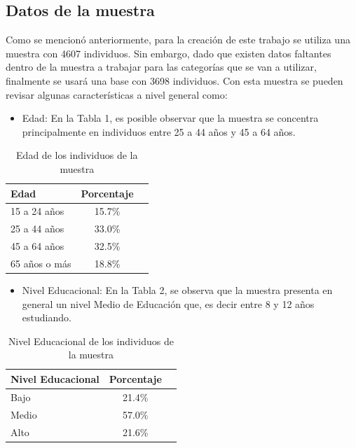 \documentclass[
  10pt,
  letterpaper,
  DIV=11,
  numbers=noendperiod,
  twocolumn]{scrartcl}
\providecommand{\tightlist}{%
  \setlength{\itemsep}{0pt}\setlength{\parskip}{0pt}}\usepackage{longtable,booktabs,array}
\begin{document}
\hypertarget{datos-de-la-muestra}{%
\subsection{Datos de la muestra}\label{datos-de-la-muestra}}

Como se mencionó anteriormente, para la creación de este trabajo se
utiliza una muestra con 4607 individuos. Sin embargo, dado que existen
datos faltantes dentro de la muestra a trabajar para las categorías que
se van a utilizar, finalmente se usará una base con 3698 individuos. Con
esta muestra se pueden revisar algunas características a nivel general
como:

\begin{itemize}
\tightlist
\item
  Edad: En la Tabla 1, es posible observar que la muestra se concentra
  principalmente en individuos entre 25 a 44 años y 45 a 64 años.
\end{itemize}

\begin{table}[H]
  \centering
  \begin{tabular}{lcc}
    \toprule
    Edad & Porcentaje \\
    \midrule
    15 a 24 años  & 15.7\% \\
    25 a 44 años  & 33.0\% \\
    45 a 64 años  & 32.5\% \\
    65 años o más & 18.8\% \\
    \bottomrule
  \end{tabular}
  \caption{Edad de los individuos de la muestra}
  
\end{table}

\begin{itemize}
\tightlist
\item
  Nivel Educacional: En la Tabla 2, se observa que la muestra presenta
  en general un nivel Medio de Educación que, es decir entre 8 y 12 años
  estudiando.
\end{itemize}

\begin{table}[H]
  \centering
  \begin{tabular}{lcc}
    \toprule
    Nivel Educacional & Porcentaje \\
    \midrule
    Bajo    & 21.4\% \\
    Medio   & 57.0\% \\
    Alto    & 21.6\% \\
    \bottomrule
  \end{tabular}
  \caption{Nivel Educacional de los individuos de la muestra}
  
\end{table}
\end{document}
